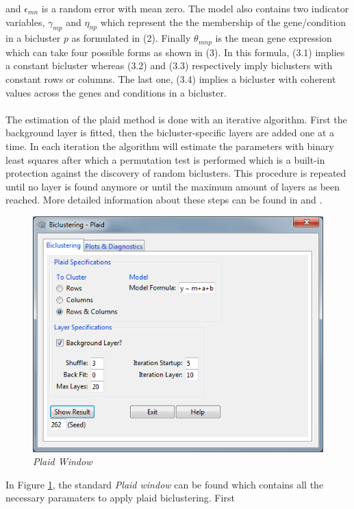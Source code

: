 \documentclass[a4paper]{article}\usepackage[]{graphicx}\usepackage[]{color}
\begin{document}
and $\epsilon_{mn}$ is a random error with mean zero. The model also contains
two indicator variables, $\gamma_{mp}$ and $\eta_{np}$ which represent the the
membership of the gene/condition in a bicluster $p$ as formulated in (2).
Finally $\theta_{mnp}$ is the mean gene expression which can take four possible
forms as shown in (3). In this formula, (3.1) implies a constant bicluster
whereas (3.2) and (3.3) respectively imply biclusters with constant rows or
columns. The last one, (3.4) implies a bicluster with coherent values across the
genes and conditions in a bicluster.
\\ \\
\noindent The estimation of the plaid method is done with an iterative
algorithm. First the background layer is fitted, then the bicluster-specific
layers are added one at a time. In each iteration the algorithm will estimate
the parameters with binary least squares after which a permutation test is
performed which is a built-in protection against the discovery of random
biclusters. This procedure is repeated until no layer is found anymore or until
the maximum amount of layers as been reached. More detailed information about these
steps can be found in \citet{Lazzeroni2000} and \citet{Turner2005}.
\begin{figure}[H]
\centering
\includegraphics[scale=0.5]{figures/plaid_clusttab.png}
\caption{{\it Plaid Window}\label{plaid_clusttab}}
\end{figure}
\noindent In Figure \ref{plaid_clusttab}, the standard {\it Plaid window} can be
found which contains all the necessary paramaters to apply plaid biclustering. First
\end{document}

